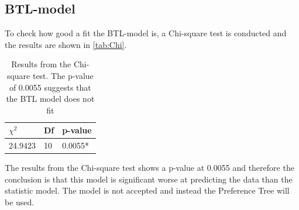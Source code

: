 \subsection*{BTL-model}
To check how good a fit the BTL-model is, a Chi-square test is conducted and the results are shown in \autoref{tab:Chi}. 
%
\begin{table}[H]
\centering
\begin{tabular}{@{}lll@{}}
\toprule
$\chi^{2}$   & Df  & p-value \\ \midrule
24.9423      & 10  & 0.0055* \\ \bottomrule
\end{tabular}
\caption{Results from the Chi-square test. The p-value of 0.0055 suggests that the BTL model does not fit}
\label{tab:Chi}
\end{table} 
\noindent 
The results from the Chi-square test shows a p-value at 0.0055 and therefore the conclusion is that this model is significant worse at predicting the data than the statistic model. The model is not accepted and instead the Preference Tree will be used. 

